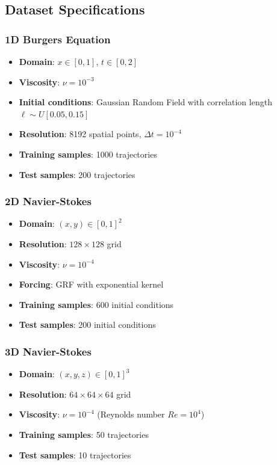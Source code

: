 \documentclass[11pt,twocolumn]{article}
\begin{document}
\subsection{Dataset Specifications}

\subsubsection{1D Burgers Equation}
\begin{itemize}
    \item \textbf{Domain}: $x \in [0, 1]$, $t \in [0, 2]$
    \item \textbf{Viscosity}: $\nu = 10^{-3}$
    \item \textbf{Initial conditions}: Gaussian Random Field with correlation length $\ell \sim U[0.05, 0.15]$
    \item \textbf{Resolution}: 8192 spatial points, $\Delta t = 10^{-4}$
    \item \textbf{Training samples}: 1000 trajectories
    \item \textbf{Test samples}: 200 trajectories
\end{itemize}

\subsubsection{2D Navier-Stokes}
\begin{itemize}
    \item \textbf{Domain}: $(x,y) \in [0, 1]^2$
    \item \textbf{Resolution}: $128 \times 128$ grid
    \item \textbf{Viscosity}: $\nu = 10^{-4}$
    \item \textbf{Forcing}: GRF with exponential kernel
    \item \textbf{Training samples}: 600 initial conditions
    \item \textbf{Test samples}: 200 initial conditions
\end{itemize}

\subsubsection{3D Navier-Stokes}
\begin{itemize}
    \item \textbf{Domain}: $(x,y,z) \in [0, 1]^3$
    \item \textbf{Resolution}: $64 \times 64 \times 64$ grid
    \item \textbf{Viscosity}: $\nu = 10^{-4}$ (Reynolds number $Re = 10^4$)
    \item \textbf{Training samples}: 50 trajectories
    \item \textbf{Test samples}: 10 trajectories
\end{itemize}
\end{document}
